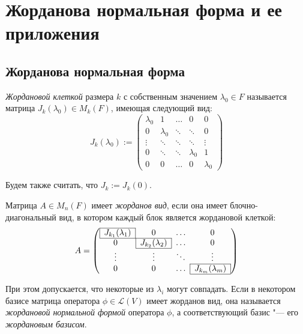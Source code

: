 \section{Жорданова нормальная форма и ее приложения}

\subsection{Жорданова нормальная форма}

\begin{definition}
	\textit{Жордановой клеткой} размера $k$ с собственным значением $\lambda_0 \in F$ называется матрица $J_k(\lambda_0) \in M_k(F)$, имеющая следующий вид:
	\[J_k(\lambda_0) := \begin{pmatrix}
		\lambda_0 & 1 & \dots & 0 & 0 \\ 
		0 & \lambda_0 & \ddots & \ddots & 0 \\ 
		\vdots & \ddots & \ddots & \ddots & \vdots \\ 
		0 & \ddots & \ddots & \lambda_0 & 1 \\ 
		0 & 0 & \dots & 0 & \lambda_0
	\end{pmatrix}\]
	
	Будем также считать, что $J_k := J_k(0)$.
\end{definition}

\begin{definition}
	Матрица $A \in M_n(F)$ имеет \textit{жорданов вид}, если она имеет блочно-диагональный вид, в котором каждый блок является жордановой клеткой:
	\[A = \left(\begin{array}{@{}cccc@{}}
		\cline{1-1}
		\multicolumn{1}{|c|}{J_{k_1}(\lambda_1)} & 0 & \dots & 0\\
		\cline{1-2}
		0 & \multicolumn{1}{|c|}{J_{k_2}(\lambda_2)} & \dots & 0\\
		\cline{2-2}
		\vdots & \vdots & \ddots & \vdots\\
		\cline{4-4}
		0 & 0 & \dots & \multicolumn{1}{|c|}{J_{k_m}(\lambda_m)}\\
		\cline{4-4}
	\end{array}\right)\]
	
	При этом допускается, что некоторые из $\lambda_i$ могут совпадать. Если в некотором базисе матрица оператора $\phi \in \mathcal{L}(V)$ имеет жорданов вид, она называется \textit{жордановой нормальной формой} оператора $\phi$, а соответствующий базис "--- его \textit{жордановым базисом}.
\end{definition}

